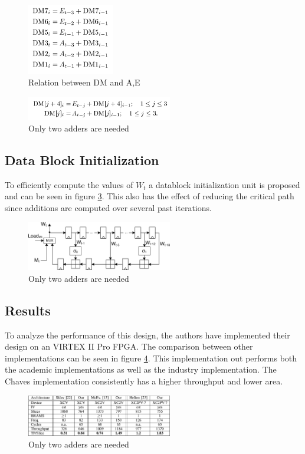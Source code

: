 \documentclass[conference]{IEEEtran}
\begin{document}
\begin{figure}[!t]
\centering
\includegraphics[width=1.5in]{eq13ceshar}
\caption{Relation between DM and A,E}
\label{fig:dmah}
\end{figure}

\begin{figure}[!t]
\centering
\includegraphics[width=2.5in]{eq14ceshar}
\caption{Only two adders are needed}
\label{fig:twoadd}
\end{figure}


\subsection{Data Block Initialization}
To efficiently compute the values of $W_{t}$ a datablock initialization unit is proposed and can be seen in figure \ref{fig:dbeceshar}. This also has the effect of reducing the critical path since additions are computed over several past iterations.

\begin{figure}[!t]
\centering
\includegraphics[width=2.5in]{datablockexpceshar}
\caption{Only two adders are needed}
\label{fig:dbeceshar}
\end{figure}



\subsection{Results}
To analyze the performance of this design, the authors have implemented their design on an VIRTEX II Pro FPGA. The comparison between other implementations can be seen in figure \ref{fig:tableceshar}. This implementation out performs both the academic implementations as well as the industry implementation. The Chaves implementation consistently has a higher throughput and lower area.
\begin{figure}[!t]
\centering
\includegraphics[width=2.5in]{tableceshar}
\caption{Only two adders are needed}
\label{fig:tableceshar}
\end{figure}
\end{document}
